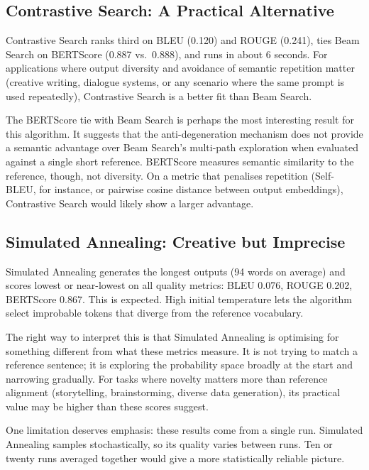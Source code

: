 \documentclass[12pt]{article}
\begin{document}
	\subsection{Contrastive Search: A Practical Alternative}
	\label{sec:contrastive_discussion}
	
	Contrastive Search ranks third on BLEU (0.120) and ROUGE (0.241), ties Beam Search on BERTScore (0.887 vs.\ 0.888), and runs in about 6 seconds. For applications where output diversity and avoidance of semantic repetition matter (creative writing, dialogue systems, or any scenario where the same prompt is used repeatedly), Contrastive Search is a better fit than Beam Search.
	
	The BERTScore tie with Beam Search is perhaps the most interesting result for this algorithm. It suggests that the anti-degeneration mechanism does not provide a semantic advantage over Beam Search's multi-path exploration when evaluated against a single short reference. BERTScore measures semantic similarity to the reference, though, not diversity. On a metric that penalises repetition (Self-BLEU, for instance, or pairwise cosine distance between output embeddings), Contrastive Search would likely show a larger advantage.
	
	\subsection{Simulated Annealing: Creative but Imprecise}
	\label{sec:sa_discussion}
	
	Simulated Annealing generates the longest outputs (94 words on average) and scores lowest or near-lowest on all quality metrics: BLEU 0.076, ROUGE 0.202, BERTScore 0.867. This is expected. High initial temperature lets the algorithm select improbable tokens that diverge from the reference vocabulary.
	
	The right way to interpret this is that Simulated Annealing is optimising for something different from what these metrics measure. It is not trying to match a reference sentence; it is exploring the probability space broadly at the start and narrowing gradually. For tasks where novelty matters more than reference alignment (storytelling, brainstorming, diverse data generation), its practical value may be higher than these scores suggest.
	
	One limitation deserves emphasis: these results come from a single run. Simulated Annealing samples stochastically, so its quality varies between runs. Ten or twenty runs averaged together would give a more statistically reliable picture.
	
\end{document}
